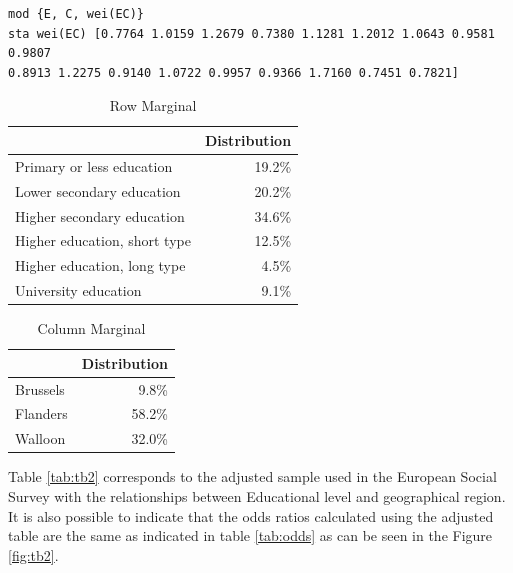 \documentclass[
  12pt,
]{article}
\begin{document}
\begin{verbatim}
mod {E, C, wei(EC)}
sta wei(EC) [0.7764 1.0159 1.2679 0.7380 1.1281 1.2012 1.0643 0.9581 0.9807 
0.8913 1.2275 0.9140 1.0722 0.9957 0.9366 1.7160 0.7451 0.7821]
\end{verbatim}

\begin{table}[H]

\caption{\label{tab:row}Row Marginal}
\centering
\begin{tabular}[t]{l|r}
\hline
  & Distribution\\
\hline
Primary or less education & 19.2\%\\
\hline
Lower secondary education & 20.2\%\\
\hline
Higher secondary education & 34.6\%\\
\hline
Higher education, short type & 12.5\%\\
\hline
Higher education, long type & 4.5\%\\
\hline
University education & 9.1\%\\
\hline
\end{tabular}
\end{table}

\begin{table}[H]

\caption{\label{tab:col}Column Marginal}
\centering
\begin{tabular}[t]{l|r}
\hline
  & Distribution\\
\hline
Brussels & 9.8\%\\
\hline
Flanders & 58.2\%\\
\hline
Walloon & 32.0\%\\
\hline
\end{tabular}
\end{table}

Table \ref{tab:tb2} corresponds to the adjusted sample used in the European Social Survey with the relationships between Educational level and geographical region.\\
It is also possible to indicate that the odds ratios calculated using the adjusted table are the same as indicated in table \ref{tab:odds} as can be seen in the Figure \ref{fig:tb2}.
\end{document}
